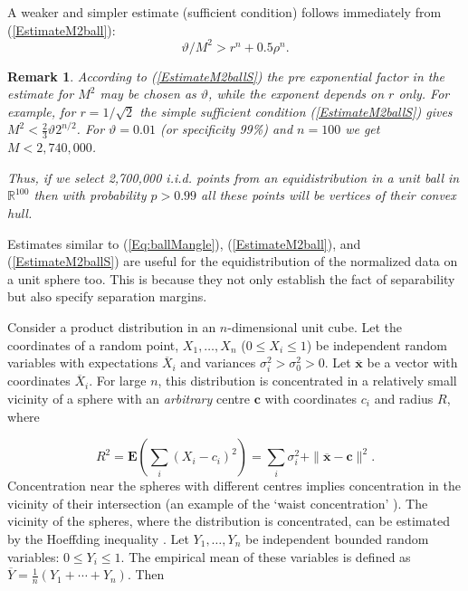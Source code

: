 \documentclass[final,5p,times,twocolumn]{elsarticle}
\newtheorem{rem}{Remark}
\begin{document}
 A weaker and simpler estimate (sufficient condition) follows immediately from (\ref{EstimateM2ball}):
 \begin{equation}\label{EstimateM2ballS}
{\vartheta}/ M^2>{r^n+0.5\rho^{n}}.
  \end{equation}
\begin{rem}\label{2,700,000} According to (\ref{EstimateM2ballS}) the pre exponential factor in the estimate for $M^2$ may be chosen as  $\vartheta $, while the exponent depends on $r$ only. For example, for $r=1/\sqrt{2}$ the simple sufficient condition (\ref{EstimateM2ballS}) gives $M^2<\frac{2}{3}\vartheta 2^{n/2}$. For $\vartheta=0.01$ (or specificity 99\%) and $n=100$ we get $M<2,740,000$.

Thus, if we select 2,700,000 i.i.d. points from an equidistribution in a unit ball in $\mathbb{R}^{100} $ then with probability $p>0.99$ {\em all} these points will be vertices of their convex hull.
\end{rem}

Estimates similar to (\ref{Eq:ballMangle}),  (\ref{EstimateM2ball}), and (\ref{EstimateM2ballS}) are useful for the equidistribution of the normalized data on a unit sphere too. This is because they not only establish the fact of separability but also specify separation margins.

Consider a product distribution in an $n$-dimensional unit cube. Let the coordinates of a random point, $X_1, \ldots, X_n$ ($0 \leq X_i \leq 1$) be independent random variables with expectations $\overline{X}_i$ and variances $\sigma_i^2>\sigma_0^2>0$. Let $\overline{\boldsymbol{x}}$ be a vector with coordinates $\overline{X}_i$. For large $n$, this distribution is concentrated in a relatively small vicinity of a sphere with an {\em arbitrary} centre $\boldsymbol{c}$ with coordinates $c_i$ and radius $R$, where

\begin{equation}\label{ConcRad}
R^2=\mathbf{E}\left(\sum_i (X_i-c_i)^2\right)=\sum_i \sigma_i^2  + \|\overline{\boldsymbol{x}}-\boldsymbol{c}\|^2.
\end{equation}
Concentration near the spheres with different centres implies concentration in the vicinity of their intersection (an example of the `waist concentration' \citep{Gromov2003}). The vicinity of the spheres, where the distribution is concentrated, can be estimated by the Hoeffding inequality \citep{Hoeffding1963}. Let  $Y_1, \ldots, Y_n$ be independent bounded random variables: $0 \leq Y_i \leq 1$. The empirical mean of these variables is defined as $\overline Y = \frac{1}{n}(Y_1 + \cdots + Y_n)$. Then
\end{document}
